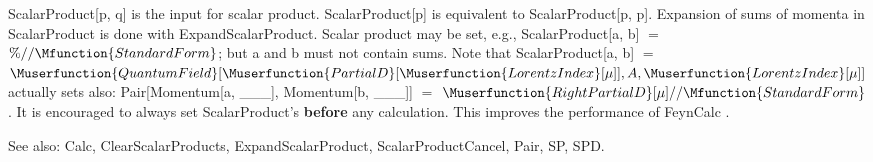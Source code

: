 






ScalarProduct[p, q] is the input for scalar product. ScalarProduct[p] is equivalent to ScalarProduct[p, p]. Expansion of sums of momenta
  in ScalarProduct is done with ExpandScalarProduct. Scalar product may be set, e.g., ScalarProduct[a, b] \(=\) \(\%//\Mfunction{StandardForm}\);
but a and b must not contain sums. Note that ScalarProduct[a, b] \(=\) \(\Muserfunction{QuantumField}[\Muserfunction{PartialD}[\Muserfunction{LorentzIndex}[\mu
]],A,\Muserfunction{LorentzIndex}[\mu ]]\) actually sets also: Pair[Momentum[a, \_{}\_{}\_{}], Momentum[b, \_{}\_{}\_{}]] \(=\) \(\Muserfunction{RightPartialD}[\mu
]//\Mfunction{StandardForm}\). It is encouraged to always set ScalarProduct's {\bfseries before} any calculation. This improves the performance of
FeynCalc .

See also: Calc, ClearScalarProducts, ExpandScalarProduct, ScalarProductCancel, Pair, SP, SPD.








